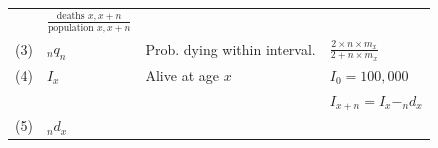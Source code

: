 \documentclass[]{book}
\begin{document}
\begin{longtable}[]{@{}llll@{}}
\begin{minipage}[t]{0.44\columnwidth}
\end{minipage} & \begin{minipage}[t]{0.10\columnwidth}\raggedright
\(\frac{\text{deaths } x,x+n}{\text{population } x,x+n }\)\strut
\end{minipage}\tabularnewline
\begin{minipage}[t]{0.12\columnwidth}\raggedright
(3)\strut
\end{minipage} & \begin{minipage}[t]{0.22\columnwidth}\raggedright
\(_nq_n\)\strut
\end{minipage} & \begin{minipage}[t]{0.44\columnwidth}\raggedright
Prob. dying within interval.\strut
\end{minipage} & \begin{minipage}[t]{0.10\columnwidth}\raggedright
\(\frac{2\times n\times m_x}{2+n\times m_x}\)\strut
\end{minipage}\tabularnewline
\begin{minipage}[t]{0.12\columnwidth}\raggedright
(4)\strut
\end{minipage} & \begin{minipage}[t]{0.22\columnwidth}\raggedright
\(I_x\)\strut
\end{minipage} & \begin{minipage}[t]{0.44\columnwidth}\raggedright
Alive at age \(x\)\strut
\end{minipage} & \begin{minipage}[t]{0.10\columnwidth}\raggedright
\(I_0=100,000\)\strut
\end{minipage}\tabularnewline
\begin{minipage}[t]{0.12\columnwidth}\raggedright
\strut
\end{minipage} & \begin{minipage}[t]{0.22\columnwidth}\raggedright
\strut
\end{minipage} & \begin{minipage}[t]{0.44\columnwidth}\raggedright
\strut
\end{minipage} & \begin{minipage}[t]{0.10\columnwidth}\raggedright
\(I_{x+n}=I_x-_nd_x\)\strut
\end{minipage}\tabularnewline
\begin{minipage}[t]{0.12\columnwidth}\raggedright
(5)\strut
\end{minipage} & \begin{minipage}[t]{0.22\columnwidth}\raggedright
\(_nd_x\)\strut
\end{minipage} & \begin{minipage}[t]{0.44\columnwidth}\raggedright

\end{minipage}
\end{longtable}
\end{document}
